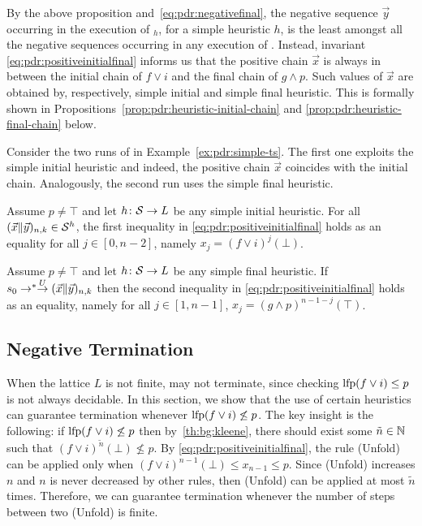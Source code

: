 By the above proposition and~\eqref{eq:pdr:negativefinal}, the negative sequence $\vec{y}$ occurring in the execution of {\APDR}$_h$, for a simple heuristic $h$, is the least amongst all the negative sequences occurring in any execution of {\APDR}.
Instead, invariant \eqref{eq:pdr:positiveinitialfinal} informs us that the positive chain $\vec{x}$ is always in between the initial chain of $f\lor i$ and the final chain of $g \land p$. Such values of $\vec{x}$ are obtained by, respectively, simple initial and simple final heuristic.
This is formally shown in Propositions~\ref{prop:pdr:heuristic-initial-chain} and \ref{prop:pdr:heuristic-final-chain} below.

\begin{example}
	Consider the two runs of {\APDR} in Example~\ref{ex:pdr:simple-ts}. The first one exploits the simple initial heuristic and indeed, the positive chain $\vec{x}$ coincides with the initial chain.
	Analogously, the second run uses the simple final heuristic.
\end{example}

\begin{prop}\label{prop:pdr:heuristic-initial-chain}
	Assume $p \neq \top$ and let $h\colon \mathcal{S} \to L$ be any simple initial heuristic.  For all $( \vec{x} \| \vec{y} )_{n,k} \in \mathcal{S}^h$, the first inequality in \eqref{eq:pdr:positiveinitialfinal} holds as an equality for all $j\in[0,n-2]$, namely $x_j=(f\lor i)^{j}(\bot)$.
\end{prop}

\begin{prop}\label{prop:pdr:heuristic-final-chain}
	Assume $p \neq \top$ and let $h\colon \mathcal{S} \to L$ be any simple final heuristic. If $s_0\stackrel{}{\to^*}\stackrel{U}{\to} ( \vec{x} \| \vec{y} )_{n,k}$ then the second inequality in \eqref{eq:pdr:positiveinitialfinal} holds as an equality, namely for all $j\in[1,n-1]$, $x_j=(g\land p)^{n-1-j}(\top)$.
\end{prop}

\subsection{Negative Termination}\label{sec:pdr:termination}
When the lattice $L$ is not finite, {\APDR} may not terminate, since checking $\text{lfp}(f \lor i) \le p$ is not always decidable. In this section, we show that the use of certain heuristics can guarantee termination whenever $\text{lfp}(f \lor i) \not\le p$.
The key insight is the following: if $\text{lfp} (f \lor i) \not \le p$ then by~\eqref{th:bg:kleene}, there should exist some $\tilde{n} \in \mathbb{N}$ such that $(f \lor i)^{\tilde{n}} (\bot) \not \le p$. By \eqref{eq:pdr:positiveinitialfinal}, the rule (Unfold) can be applied only when $(f \lor i)^{n-1} (\bot) \le x_{n-1} \le p$. Since (Unfold) increases $n$ and $n$ is never decreased by other rules, then (Unfold) can be applied at most $\tilde{n}$ times. Therefore, we can guarantee termination whenever the number of steps between two (Unfold) is finite.

